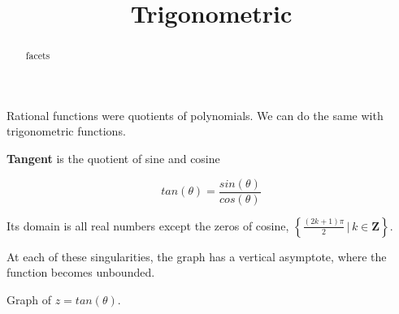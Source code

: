 \documentclass{ximera}
\title{Trigonometric}
\begin{document}
\begin{abstract}
facets
\end{abstract}
\maketitle




Rational functions were quotients of polynomials.  We can do the same with trigonometric functions.


\begin{definition}
\textbf{Tangent} is the quotient of sine and cosine


\[   tan(\theta) = \frac{sin(\theta)}{cos(\theta)}      \]



Its domain is all real numbers except the zeros of cosine, $\left\{  \frac{(2k+1)\pi}{2}   \, | \,   k \in \textbf{Z}   \right\}$.

\end{definition}


At each of these singularities, the graph has a vertical asymptote, where the function becomes unbounded.




Graph of $z = tan(\theta)$.
\end{document}
